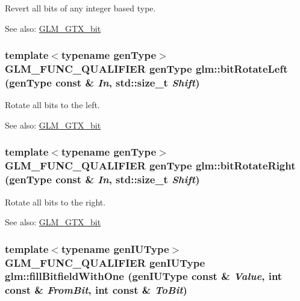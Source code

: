 Revert all bits of any integer based type. \begin{Desc}
\item[See also:]\hyperlink{group__gtx__bit}{GLM\_\-GTX\_\-bit} \end{Desc}
\hypertarget{group__gtx__bit_g4cd980832ab9c35c73f8c76b8f309c92}{
\subsubsection[bitRotateLeft]{\setlength{\rightskip}{0pt plus 5cm}template$<$typename genType$>$ GLM\_\-FUNC\_\-QUALIFIER genType glm::bitRotateLeft (genType const \& {\em In}, \/  std::size\_\-t {\em Shift})}}
\label{group__gtx__bit_g4cd980832ab9c35c73f8c76b8f309c92}


Rotate all bits to the left. \begin{Desc}
\item[See also:]\hyperlink{group__gtx__bit}{GLM\_\-GTX\_\-bit} \end{Desc}
\hypertarget{group__gtx__bit_g01a6893d9fa57a4df1f6f7b0d399268d}{
\subsubsection[bitRotateRight]{\setlength{\rightskip}{0pt plus 5cm}template$<$typename genType$>$ GLM\_\-FUNC\_\-QUALIFIER genType glm::bitRotateRight (genType const \& {\em In}, \/  std::size\_\-t {\em Shift})}}
\label{group__gtx__bit_g01a6893d9fa57a4df1f6f7b0d399268d}


Rotate all bits to the right. \begin{Desc}
\item[See also:]\hyperlink{group__gtx__bit}{GLM\_\-GTX\_\-bit} \end{Desc}
\hypertarget{group__gtx__bit_g98140d04738cfe05d70f090a7f1151f9}{
\subsubsection[fillBitfieldWithOne]{\setlength{\rightskip}{0pt plus 5cm}template$<$typename genIUType$>$ GLM\_\-FUNC\_\-QUALIFIER genIUType glm::fillBitfieldWithOne (genIUType const \& {\em Value}, \/  int const \& {\em FromBit}, \/  int const \& {\em ToBit})}}
\label{group__gtx__bit_g98140d04738cfe05d70f090a7f1151f9}


